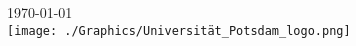\begin{titlepage}
    
    {\large \today}\\[2cm] %
    
    
    \texttt{[image: ./Graphics/Universität\_Potsdam\_logo.png]} \\ %
     
    
    \vfill %
    
    \end{titlepage}